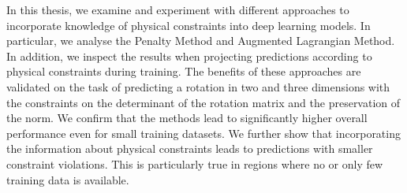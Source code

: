 \indent In this thesis, we examine and experiment with different approaches to incorporate knowledge of physical constraints into deep learning models. In particular, we analyse the Penalty Method and Augmented Lagrangian Method. In addition, we inspect the results when projecting predictions according to physical constraints during training. The benefits of these approaches are validated on the task of predicting a rotation in two and three dimensions with the constraints on the determinant of the rotation matrix and the preservation of the norm. We confirm that the methods lead to significantly higher overall performance even for small training datasets. We further show that incorporating the information about physical constraints leads to predictions with smaller constraint violations. This is particularly true in regions where no or only few training data is available.
